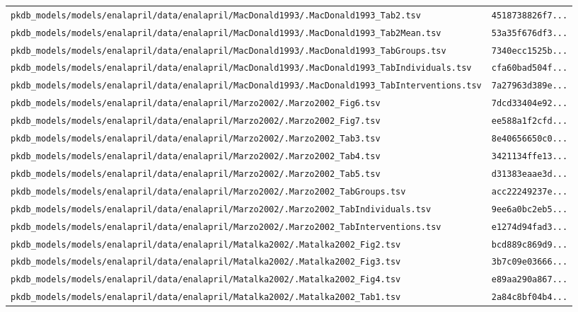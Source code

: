 \documentclass{article}
\begin{document}
\begin{longtable}{ll}
\texttt{pkdb\_models/models/enalapril/data/enalapril/MacDonald1993/.MacDonald1993\_Tab2.tsv} & \texttt{4518738826f7...} \\
\texttt{pkdb\_models/models/enalapril/data/enalapril/MacDonald1993/.MacDonald1993\_Tab2Mean.tsv} & \texttt{53a35f676df3...} \\
\texttt{pkdb\_models/models/enalapril/data/enalapril/MacDonald1993/.MacDonald1993\_TabGroups.tsv} & \texttt{7340ecc1525b...} \\
\texttt{pkdb\_models/models/enalapril/data/enalapril/MacDonald1993/.MacDonald1993\_TabIndividuals.tsv} & \texttt{cfa60bad504f...} \\
\texttt{pkdb\_models/models/enalapril/data/enalapril/MacDonald1993/.MacDonald1993\_TabInterventions.tsv} & \texttt{7a27963d389e...} \\
\texttt{pkdb\_models/models/enalapril/data/enalapril/Marzo2002/.Marzo2002\_Fig6.tsv} & \texttt{7dcd33404e92...} \\
\texttt{pkdb\_models/models/enalapril/data/enalapril/Marzo2002/.Marzo2002\_Fig7.tsv} & \texttt{ee588a1f2cfd...} \\
\texttt{pkdb\_models/models/enalapril/data/enalapril/Marzo2002/.Marzo2002\_Tab3.tsv} & \texttt{8e40656650c0...} \\
\texttt{pkdb\_models/models/enalapril/data/enalapril/Marzo2002/.Marzo2002\_Tab4.tsv} & \texttt{3421134ffe13...} \\
\texttt{pkdb\_models/models/enalapril/data/enalapril/Marzo2002/.Marzo2002\_Tab5.tsv} & \texttt{d31383eaae3d...} \\
\texttt{pkdb\_models/models/enalapril/data/enalapril/Marzo2002/.Marzo2002\_TabGroups.tsv} & \texttt{acc22249237e...} \\
\texttt{pkdb\_models/models/enalapril/data/enalapril/Marzo2002/.Marzo2002\_TabIndividuals.tsv} & \texttt{9ee6a0bc2eb5...} \\
\texttt{pkdb\_models/models/enalapril/data/enalapril/Marzo2002/.Marzo2002\_TabInterventions.tsv} & \texttt{e1274d94fad3...} \\
\texttt{pkdb\_models/models/enalapril/data/enalapril/Matalka2002/.Matalka2002\_Fig2.tsv} & \texttt{bcd889c869d9...} \\
\texttt{pkdb\_models/models/enalapril/data/enalapril/Matalka2002/.Matalka2002\_Fig3.tsv} & \texttt{3b7c09e03666...} \\
\texttt{pkdb\_models/models/enalapril/data/enalapril/Matalka2002/.Matalka2002\_Fig4.tsv} & \texttt{e89aa290a867...} \\
\texttt{pkdb\_models/models/enalapril/data/enalapril/Matalka2002/.Matalka2002\_Tab1.tsv} & \texttt{2a84c8bf04b4...} \\

\end{longtable}
\end{document}

